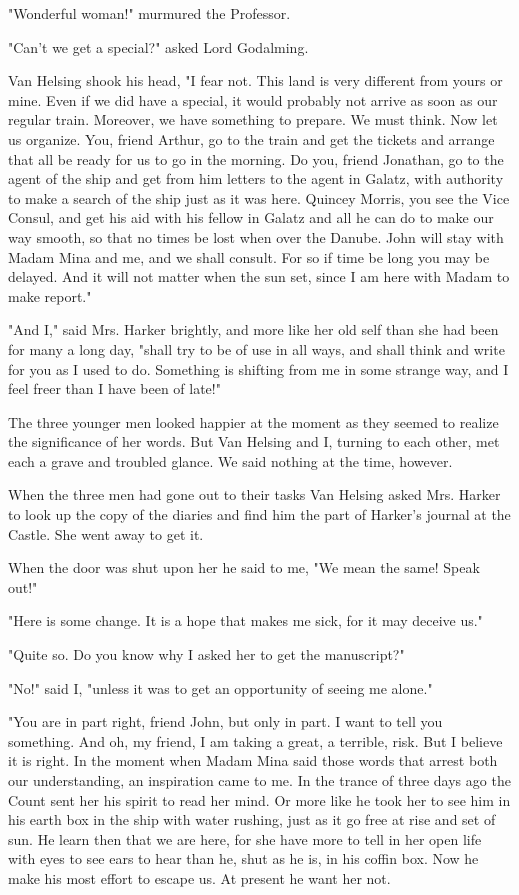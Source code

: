 "Wonderful woman!" murmured the Professor. 

"Can't we get a special?" asked Lord Godalming. 

Van Helsing shook his head, "I fear not. This land is very different from yours or mine. Even if we did have a special, it would probably not arrive as soon as our regular train. Moreover, we have something to prepare. We must think. Now let us organize. You, friend Arthur, go to the train and get the tickets and arrange that all be ready for us to go in the morning. Do you, friend Jonathan, go to the agent of the ship and get from him letters to the agent in Galatz, with authority to make a search of the ship just as it was here. Quincey Morris, you see the Vice Consul, and get his aid with his fellow in Galatz and all he can do to make our way smooth, so that no times be lost when over the Danube. John will stay with Madam Mina and me, and we shall consult. For so if time be long you may be delayed. And it will not matter when the sun set, since I am here with Madam to make report." 

"And I," said Mrs. Harker brightly, and more like her old self than she had been for many a long day, "shall try to be of use in all ways, and shall think and write for you as I used to do. Something is shifting from me in some strange way, and I feel freer than I have been of late!" 

The three younger men looked happier at the moment as they seemed to realize the significance of her words. But Van Helsing and I, turning to each other, met each a grave and troubled glance. We said nothing at the time, however. 

When the three men had gone out to their tasks Van Helsing asked Mrs. Harker to look up the copy of the diaries and find him the part of Harker's journal at the Castle. She went away to get it. 

When the door was shut upon her he said to me, "We mean the same! Speak out!" 

"Here is some change. It is a hope that makes me sick, for it may deceive us." 

"Quite so. Do you know why I asked her to get the manuscript?" 

"No!" said I, "unless it was to get an opportunity of seeing me alone." 

"You are in part right, friend John, but only in part. I want to tell you something. And oh, my friend, I am taking a great, a terrible, risk. But I believe it is right. In the moment when Madam Mina said those words that arrest both our understanding, an inspiration came to me. In the trance of three days ago the Count sent her his spirit to read her mind. Or more like he took her to see him in his earth box in the ship with water rushing, just as it go free at rise and set of sun. He learn then that we are here, for she have more to tell in her open life with eyes to see ears to hear than he, shut as he is, in his coffin box. Now he make his most effort to escape us. At present he want her not. 

